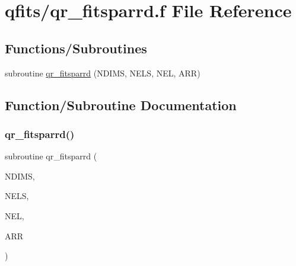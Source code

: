 \hypertarget{qr__fitsparrd_8f}{}\section{qfits/qr\+\_\+fitsparrd.f File Reference}
\label{qr__fitsparrd_8f}
\subsection*{Functions/\+Subroutines}
\begin{DoxyCompactItemize}
\item 
subroutine \hyperlink{qr__fitsparrd_8f_a422586db25bc6d544a9bb63588668dcb}{qr\+\_\+fitsparrd} (N\+D\+I\+MS, N\+E\+LS, N\+EL, A\+RR)
\end{DoxyCompactItemize}


\subsection{Function/\+Subroutine Documentation}
\mbox{\label{qr__fitsparrd_8f_a422586db25bc6d544a9bb63588668dcb}} 
\subsubsection{\texorpdfstring{qr\+\_\+fitsparrd()}{qr\_fitsparrd()}}
{\footnotesize\ttfamily subroutine qr\+\_\+fitsparrd (\begin{DoxyParamCaption}\item[{integer}]{N\+D\+I\+MS,  }\item[{integer, dimension(ndims)}]{N\+E\+LS,  }\item[{integer}]{N\+EL,  }\item[{double precision, dimension(nel)}]{A\+RR }\end{DoxyParamCaption})}

